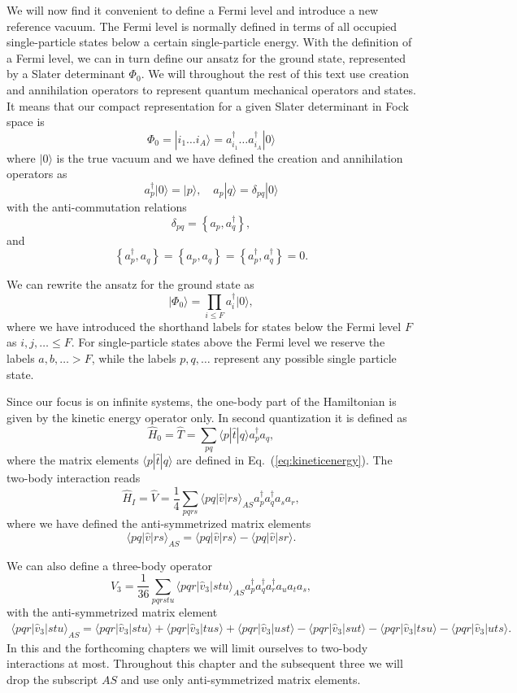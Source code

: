 We will now find it convenient to define a Fermi level and introduce a
new reference vacuum. The Fermi level is normally  defined in terms of all
occupied single-particle states below a certain
single-particle energy.  With the definition of a Fermi level, we can
in turn define our ansatz for the ground state, represented by a
Slater determinant $\Phi_0$.  We will throughout the rest of this
text use creation and annihilation operators to represent quantum
mechanical operators and states.  It means that our compact
representation for a given Slater determinant in Fock space is
\[
  \Phi_{0}=|i_1 \dots i_A\rangle= a_{i_1}^{\dagger} \dots
  a_{i_A}^{\dagger} |0\rangle
\]
where $\vert 0\rangle$ is the true vacuum and we have defined the
creation and annihilation operators as
    \[
        a_p^\dagger|0\rangle = |p\rangle, \quad a_p |q\rangle =
        \delta_{pq}|0\rangle
    \]
with the anti-commutation relations
\[
  \delta_{pq} = \left\{a_p, a_q^\dagger \right\},
\]
and
\[
\left\{a_p^\dagger, a_q \right\} = \left\{a_p, a_q \right\} =
\left\{a_p^\dagger, a_q^\dagger \right\}=0.
\]

We can rewrite the ansatz for the ground state as
\[
\vert\Phi_0\rangle = \prod_{i\le F}a_{i}^{\dagger} |0\rangle,
\]
where we have introduced the shorthand labels for states below the
Fermi level $F$ as $i,j,\ldots \leq F$. For single-particle states
above the Fermi level we reserve the labels $a,b,\ldots > F$, while
the labels $p,q, \ldots$ represent any possible single particle state.


Since our focus is on infinite systems, the one-body part of the
Hamiltonian is given by the kinetic energy operator only.  In second
quantization it is defined as
\[
\hat{H}_0=\hat{T} = \sum_{pq} \langle p|\hat{t}|q\rangle a_p^\dagger
a_q,
\]
where the matrix elements $\langle p|\hat{t}|q\rangle$ are defined in
Eq.~(\ref{eq:kineticenergy}).  The two-body interaction reads
\[
\hat{H}_I=\hat{V} = \frac{1}{4} \sum_{pqrs} \langle
pq|\hat{v}|rs\rangle_{AS} a_p^\dagger a_q^\dagger a_s a_r,
\]
where we have defined the anti-symmetrized matrix elements
\[
\langle pq|\hat{v}|rs\rangle_{AS} = \langle pq|\hat{v}|rs\rangle -
\langle pq|\hat{v}|sr\rangle.
\]

We can also define a three-body operator
\[
\hat{V}_3 = \frac{1}{36} \sum_{pqrstu} \langle
pqr|\hat{v}_3|stu\rangle_{AS} a_p^\dagger a_q^\dagger a_r^\dagger a_u
a_t a_s,
\]
with the anti-symmetrized matrix element
\begin{align}
            \langle pqr|\hat{v}_3|stu\rangle_{AS} = \langle
            pqr|\hat{v}_3|stu\rangle + \langle
            pqr|\hat{v}_3|tus\rangle + \langle
            pqr|\hat{v}_3|ust\rangle- \langle pqr|\hat{v}_3|sut\rangle
            - \langle pqr|\hat{v}_3|tsu\rangle - \langle
            pqr|\hat{v}_3|uts\rangle.
\end{align}
In this and the forthcoming chapters we will limit ourselves to
two-body interactions at most.  Throughout this chapter and the subsequent three we will drop the subscript $AS$ and use only anti-symmetrized matrix elements.

